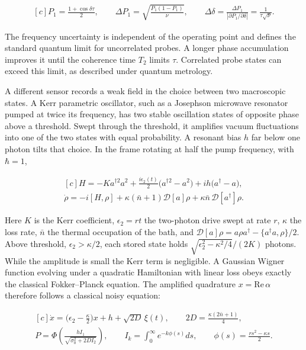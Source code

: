 \documentclass[11pt,oneside]{book}
\newenvironment{centeredalign}{\[\begin{gathered}[c]}{\end{gathered}\]}
\begin{document}
\begin{centeredalign}
P_1=\frac{1+\cos\delta\tau}{2},\qquad \Delta P_1=\sqrt{\frac{P_1(1-P_1)}{\nu}},\qquad
\Delta\delta=\frac{\Delta P_1}{|\partial P_1/\partial\delta|}=\frac{1}{\tau\sqrt\nu}.
\end{centeredalign}

The frequency uncertainty is independent of the operating point and defines the standard quantum limit for uncorrelated probes. A longer phase accumulation improves it until the coherence time \(T_2\) limits \(\tau\). Correlated probe states can exceed this limit, as described under quantum metrology.

A different sensor records a weak field in the choice between two macroscopic states. A Kerr parametric oscillator, such as a Josephson microwave resonator pumped at twice its frequency, has two stable oscillation states of opposite phase above a threshold. Swept through the threshold, it amplifies vacuum fluctuations into one of the two states with equal probability. A resonant bias \(h\) far below one photon tilts that choice. In the frame rotating at half the pump frequency, with \(\hbar=1\),

\begin{centeredalign}
H=-Ka^{\dagger2}a^2+\frac{i\epsilon_2(t)}{2}\big(a^{\dagger2}-a^2\big)+ih\big(a^\dagger-a\big),\\
\dot\rho=-i[H,\rho]+\kappa(\bar n+1)\mathcal D[a]\rho+\kappa\bar n\,\mathcal D[a^\dagger]\rho.
\end{centeredalign}

Here \(K\) is the Kerr coefficient, \(\epsilon_2=rt\) the two-photon drive swept at rate \(r\), \(\kappa\) the loss rate, \(\bar n\) the thermal occupation of the bath, and \(\mathcal D[a]\rho=a\rho a^\dagger-\{a^\dagger a,\rho\}/2\). Above threshold, \(\epsilon_2>\kappa/2\), each stored state holds \(\sqrt{\epsilon_2^2-\kappa^2/4}/(2K)\) photons. While the amplitude is small the Kerr term is negligible. A Gaussian Wigner function evolving under a quadratic Hamiltonian with linear loss obeys exactly the classical Fokker--Planck equation. The amplified quadrature \(x=\mathrm{Re}\,\alpha\) therefore follows a classical noisy equation:

\begin{centeredalign}
\dot x=\big(\epsilon_2-\tfrac{\kappa}{2}\big)x+h+\sqrt{2D}\,\xi(t),\qquad 2D=\frac{\kappa(2\bar n+1)}{4},\\
P=\Phi\!\left(\frac{hI_1}{\sqrt{\sigma_0^2+2DI_2}}\right),\qquad I_k=\int_0^\infty e^{-k\phi(s)}ds,\qquad
\phi(s)=\frac{rs^2-\kappa s}{2}.
\end{centeredalign}
\end{document}

